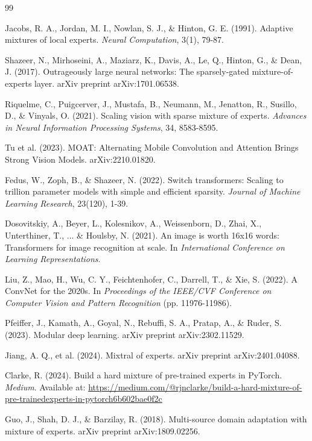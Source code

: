 \documentclass[11pt,a4paper]{article}
\begin{document}
\begin{thebibliography}{99}

Jacobs, R. A., Jordan, M. I., Nowlan, S. J., \& Hinton, G. E. (1991). Adaptive mixtures of local experts. \textit{Neural Computation}, 3(1), 79-87.

Shazeer, N., Mirhoseini, A., Maziarz, K., Davis, A., Le, Q., Hinton, G., \& Dean, J. (2017). Outrageously large neural networks: The sparsely-gated mixture-of-experts layer. arXiv preprint arXiv:1701.06538.

Riquelme, C., Puigcerver, J., Mustafa, B., Neumann, M., Jenatton, R., Susillo, D., \& Vinyals, O. (2021). Scaling vision with sparse mixture of experts. \textit{Advances in Neural Information Processing Systems}, 34, 8583-8595.

Tu et al. (2023). MOAT: Alternating Mobile Convolution and Attention Brings Strong Vision Models. arXiv:2210.01820.

Fedus, W., Zoph, B., \& Shazeer, N. (2022). Switch transformers: Scaling to trillion parameter models with simple and efficient sparsity. \textit{Journal of Machine Learning Research}, 23(120), 1-39.

Dosovitskiy, A., Beyer, L., Kolesnikov, A., Weissenborn, D., Zhai, X., Unterthiner, T., ... \& Houlsby, N. (2021). An image is worth 16x16 words: Transformers for image recognition at scale. In \textit{International Conference on Learning Representations}.

Liu, Z., Mao, H., Wu, C. Y., Feichtenhofer, C., Darrell, T., \& Xie, S. (2022). A ConvNet for the 2020s. In \textit{Proceedings of the IEEE/CVF Conference on Computer Vision and Pattern Recognition} (pp. 11976-11986).

Pfeiffer, J., Kamath, A., Goyal, N., Rebuffi, S. A., Pratap, A., \& Ruder, S. (2023). Modular deep learning. arXiv preprint arXiv:2302.11529.

Jiang, A. Q., et al. (2024). Mixtral of experts. arXiv preprint arXiv:2401.04088.

Clarke, R. (2024). Build a hard mixture of pre-trained experts in PyTorch. \textit{Medium}. Available at: \url{https://medium.com/@rjnclarke/build-a-hard-mixture-of-pre-trainedexperts-in-pytorch6b602bae0f2c}

Guo, J., Shah, D. J., \& Barzilay, R. (2018). Multi-source domain adaptation with mixture of experts. arXiv preprint arXiv:1809.02256.


\end{thebibliography}
\end{document}
